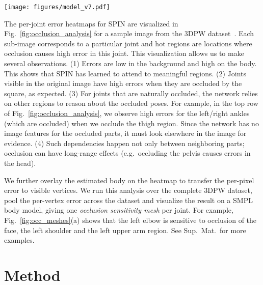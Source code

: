 \documentclass[10pt,twocolumn,letterpaper,usenames,dvipsnames]{article}
\newcommand{\methodname}{PARE\xspace}
\newcommand{\figref}[1]{Fig.~\ref{#1}}
\newcommand{\supmat}{Sup.~Mat.\xspace}
\begin{document}
\begin{figure*}[h]
	\centerline{
		\texttt{[image: figures/model\_v7.pdf]}}
	\caption{\textbf{{\methodname} model architecture.} 
		Given an input image, {\methodname} extracts two pixel-level features  and , which are fused by part attention (green box) leading to the final feature  for camera and SMPL body regression.
	}
	\label{fig:model}
	\vspace{-2ex}
\end{figure*}{}

The per-joint error heatmaps for SPIN are visualized in \figref{fig:occlusion_analysis} for a sample image from the 3DPW dataset~\cite{vonMarcard2018_3dpw}.
Each sub-image corresponds to a particular joint and hot regions are locations where occlusion causes high error in this joint.  
This visualization allows us to make several observations.
(1) Errors are low in the background and high on the body. This shows that SPIN has learned to attend to meaningful regions.
(2) Joints visible in the original image have high errors when they are occluded by the square, as expected.
(3) For joints that are naturally occluded, the network relies on other regions to reason about the occluded poses. 
For example, in the top row of Fig.~\ref{fig:occlusion_analysis}, we observe high errors for the left/right ankles (which are occluded) when we occlude the thigh region.
Since the network has no image features for the occluded parts, it must look elsewhere in the image for evidence.
(4) Such dependencies happen not only between neighboring parts; occlusion can have long-range effects (e.g.~occluding the pelvis causes errors in the head). 

We further overlay the estimated body on the heatmap to transfer the per-pixel error to visible vertices.
We run this analysis over the complete 3DPW dataset, pool the per-vertex error across the dataset and visualize the result on a SMPL body model, giving one \emph{occlusion sensitivity mesh} per joint.
For example, Fig.~\ref{fig:occ_meshes}(a) shows that the left elbow is sensitive to occlusion of the face, the left shoulder and the left upper arm region. See \supmat~for more examples. \section{Method}
\label{methods}
\end{document}
